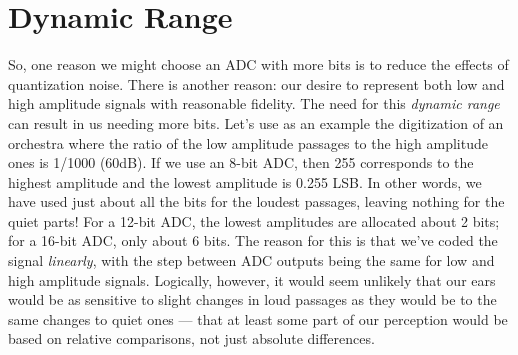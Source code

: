 

\section{Dynamic Range}

So, one reason we might choose an ADC with more bits is to reduce the
effects of quantization noise.  There is another reason: our desire to
represent both low and high amplitude signals with reasonable
fidelity. The need for this \emph{dynamic range} can result in us
needing more bits.  Let's use as an example the digitization of an
orchestra where the ratio of the low amplitude passages to the high
amplitude ones is 1/1000 (60dB).  If we use an 8-bit ADC, then 255
corresponds to the highest amplitude and the lowest amplitude is 0.255
LSB. In other words, we have used just about all the bits for the
loudest passages, leaving nothing for the quiet parts!  For a 12-bit
ADC, the lowest amplitudes are allocated about 2 bits; for a 16-bit
ADC, only about 6 bits. The reason for this is that we've coded the
signal \emph{linearly}, with the step between ADC outputs being the
same for low and high amplitude signals. Logically, however, it would
seem unlikely that our ears would be as sensitive to slight changes in
loud passages as they would be to the same changes to quiet ones ---
that at least some part of our perception would be based on relative
comparisons, not just absolute differences.

